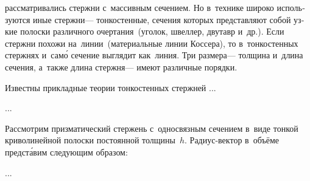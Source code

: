 

\thispagestyle{empty}

\label{chapter:thinwalledrods}



\begin{otherlanguage}{russian}

  рассматривались стержни с~массивным сечением. Но в~технике широко используются иные стержни\:--- тонкостенные, сечения которых представляют собой узкие полоски различного очертания~(уголок, швеллер, двутавр и~др.). Если стержни похожи на~линии~(материальные линии Коссера), то в~тонкостенных стержнях и~сам\'{о} сечение выглядит как~линия. Три размера\:--- толщина и~длина сечения, а~также длина стержня\:--- имеют различные порядки.

Известны прикладные теории тонкостенных стержней ...

...



\end{otherlanguage}



\begin{otherlanguage}{russian}

Рассмотрим призматический стержень с~односвязным сечением в~виде тонкой криволинейной полоски постоянной толщины~$h$. Радиус\hbox{-}вектор в~объёме предст\'{а}вим следующим образом:

...



\end{otherlanguage}


